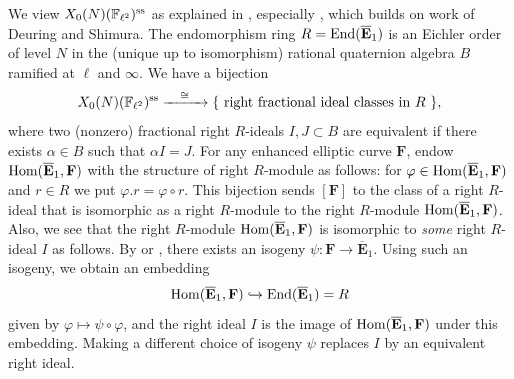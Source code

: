 \documentclass{article} \usepackage[active]{srcltx}
\newcommand{\eE}{\mathbf{E}}
\newcommand{\Felltwo}{\F_{\ell^2}}
\newcommand{\Eonebar}{\overline{\eE}_1}
\DeclareMathOperator{\supersingular}{ss}
\renewcommand{\ss}{\supersingular}
\begin{document}
We view $X_0(N)(\Felltwo)^{\ss}$ as explained in
\cite[\S3]{ribet:modreps}, especially \cite[Rmk.~3.5,
pg~441]{ribet:modreps}, which builds on work of Deuring and Shimura.
The endomorphism ring $R=\End(\overline{\eE}_1)$ is an Eichler order
of level $N$ in the (unique up to isomorphism) rational quaternion
algebra $B$ ramified at $\ell$ and $\infty$.  We have a bijection
\begin{equation}\label{eqn:equiv}
 X_0(N)(\Felltwo)^{\ss}
\xrightarrow{\quad\isom\quad} \{\text{ right fractional ideal classes in $R$ }\},
\end{equation} where two (nonzero) fractional right $R$-ideals $I,J
\subset B$ are equivalent if there exists $\alpha \in B$ such that
$\alpha I = J$.
For any enhanced elliptic curve $\mathbf{F}$, 
endow
$\Hom(\Eonebar,\mathbf{F})$ with the structure of right $R$-module as
follows: for $\varphi \in \Hom(\Eonebar,\mathbf{F})$ and $r\in R$ we
put $\varphi.r = \varphi \circ r$.  
This bijection sends $[\mathbf{F}]$ to the class of a
right $R$-ideal that is isomorphic as a right $R$-module to the right $R$-module
$\Hom(\Eonebar,\mathbf{F})$.
Also, we see that the right
$R$-module $\Hom(\Eonebar,\mathbf{F})$ is isomorphic to {\em some} right
$R$-ideal $I$ as follows.  By \cite[\S2.4,
pg.~223]{mestre:graphs} or \cite[Lem.~3.17]{ribet:modreps}, there exists an isogeny $\psi:
\mathbf{F} \to \Eonebar$.
Using such an isogeny, we obtain an embedding
$$
   \Hom(\Eonebar,\mathbf{F}) \hra \End(\Eonebar)=R
$$
given by $\varphi \mapsto \psi \circ \varphi$, and the right ideal $I$ is
the image of $\Hom(\Eonebar,\mathbf{F})$ under this embedding.  Making
a different choice of isogeny $\psi$ replaces $I$ by an equivalent 
right ideal.

\newcommand{\Rbar}{\overline{R}}
\end{document}
